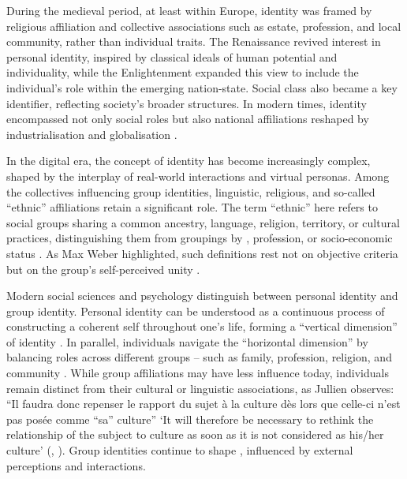 \documentclass[output=paper,colorlinks,citecolor=brown]{langscibook}
\begin{document}
During the medieval period, at least within Europe, identity was framed by religious affiliation and collective associations such as estate, profession, and local community, rather than individual traits. The Renaissance revived interest in personal identity, inspired by classical ideals of human potential and individuality, while the Enlightenment expanded this view to include the individual's role within the emerging nation-state. Social class also became a key identifier, reflecting society's broader structures. In modern times, identity encompassed not only social roles \citep{tajfel_billig_bundy1971,tajfel_turner1979} but also national affiliations reshaped by industrialisation and globalisation \citep{brubaker_cooper2000}.

In the digital era, the concept of identity has become increasingly complex, shaped by the interplay of real-world interactions and virtual personas. Among the collectives influencing group identities, linguistic, religious, and so-called ``ethnic'' affiliations retain a significant role. The term ``ethnic'' here refers to social groups sharing a common ancestry, language, religion, territory, or cultural practices, distinguishing them from groupings by , profession, or socio-economic status \citep{peoples_bailey2010}. As Max Weber highlighted, such definitions rest not on objective criteria but on the group's self-perceived unity \citep{weber1968}.

Modern social sciences and psychology distinguish between personal identity and group identity. Personal identity can be understood as a continuous process of constructing a coherent self throughout one's life, forming a ``vertical dimension'' of identity \citep{erikson1980}. In parallel, individuals navigate the ``horizontal dimension'' by balancing roles across different groups -- such as family, profession, religion, and community \citep{goffman1963}. While group affiliations may have less influence today, individuals remain distinct from their cultural or linguistic associations, as Jullien observes: ``Il faudra donc repenser le rapport du sujet à la culture dès lors que celle-ci n'est pas posée comme ``sa'' culture''  `It will therefore be necessary to rethink the relationship of the subject to culture as soon as it is not considered as his/her culture' (\citealt[57]{jullien2016}, \citealt{jullien2021}). Group identities continue to shape , influenced by external perceptions and interactions.
\end{document}

